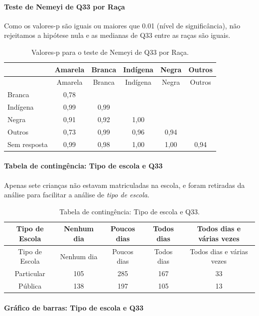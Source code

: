 \documentclass[]{article}
\let\oldparagraph\paragraph
\renewcommand{\paragraph}[1]{\oldparagraph{#1}\mbox{}}
\begin{document}
\hypertarget{teste-de-nemeyi-de-q33-por-rauxe7a}{%
\paragraph{Teste de Nemeyi de Q33 por Raça}\label{teste-de-nemeyi-de-q33-por-rauxe7a}}

Como os valores-p são iguais ou maiores que 0.01 (nível de significância), não rejeitamos a hipótese nula e as medianas de Q33 entre as raças são iguais.

\begin{longtable}[]{@{}lccccc@{}}
\caption{\label{tab:unnamed-chunk-1172}Valores-p para o teste de Nemeyi de Q33 por Raça.}\tabularnewline
\toprule
& Amarela & Branca & Indígena & Negra & Outros\tabularnewline
\midrule
\endfirsthead
\toprule
& Amarela & Branca & Indígena & Negra & Outros\tabularnewline
\midrule
\endhead
Branca & 0,78 & & & &\tabularnewline
Indígena & 0,99 & 0,99 & & &\tabularnewline
Negra & 0,91 & 0,92 & 1,00 & &\tabularnewline
Outros & 0,73 & 0,99 & 0,96 & 0,94 &\tabularnewline
Sem resposta & 0,99 & 0,98 & 1,00 & 1,00 & 0,94\tabularnewline
\bottomrule
\end{longtable}

\cleardoublepage

\hypertarget{tabela-de-continguxeancia-tipo-de-escola-e-q33}{%
\paragraph{Tabela de contingência: Tipo de escola e Q33}\label{tabela-de-continguxeancia-tipo-de-escola-e-q33}}

Apenas sete crianças não estavam matriculadas na escola, e foram retiradas da análise para facilitar a análise de \emph{tipo de escola}.

\begin{longtable}[]{@{}ccccc@{}}
\caption{\label{tab:unnamed-chunk-1173}Tabela de contingência: Tipo de escola e Q33.}\tabularnewline
\toprule
Tipo de Escola & Nenhum dia & Poucos dias & Todos dias & Todos dias e várias vezes\tabularnewline
\midrule
\endfirsthead
\toprule
Tipo de Escola & Nenhum dia & Poucos dias & Todos dias & Todos dias e várias vezes\tabularnewline
\midrule
\endhead
Particular & 105 & 285 & 167 & 33\tabularnewline
Pública & 138 & 197 & 105 & 13\tabularnewline
\bottomrule
\end{longtable}

\hypertarget{gruxe1fico-de-barras-tipo-de-escola-e-q33}{%
\paragraph{Gráfico de barras: Tipo de escola e Q33}\label{gruxe1fico-de-barras-tipo-de-escola-e-q33}}
\end{document}
